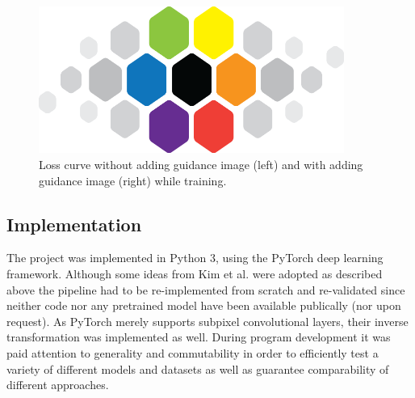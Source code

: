 \begin{figure}[!htbp]
	\centering
	\includegraphics[width=10cm]{figures/cvl}
	\caption{Loss curve without adding guidance image (left) and with
  adding guidance image (right) while training.}
  \label{fig:loss_w_wo_adding_guidance}
\end{figure}

\subsection{Implementation}
\label{sec:Approach_IMP}
The project was implemented in Python 3, using the PyTorch deep learning
framework. Although some ideas from Kim et al. \cite{TAID} were adopted as
described above the pipeline had to be re-implemented from scratch and
re-validated since neither code nor any pretrained model have been
available publically (nor upon request). As PyTorch merely supports
subpixel convolutional layers, their inverse transformation was implemented as
well. During program development it was paid attention to generality and
commutability in order to efficiently test a variety of different models and
datasets as well as guarantee comparability of different approaches. 

